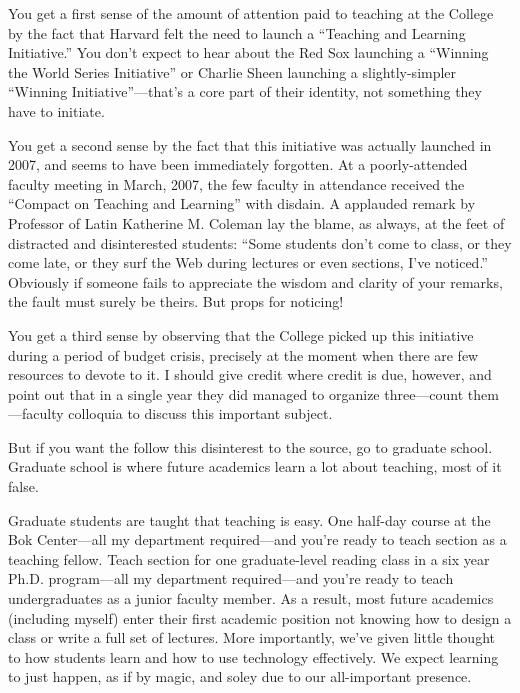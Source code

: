 
You get a first sense of the amount of attention paid to teaching at the
College by the fact that Harvard felt the need to launch a ``Teaching and
Learning Initiative.'' You don't expect to hear about the Red Sox launching a
``Winning the World Series Initiative'' or Charlie Sheen launching a
slightly-simpler ``Winning Initiative''---that's a core part of their
identity, not something they have to initiate.

You get a second sense by the fact that this initiative was actually launched
in 2007, and seems to have been immediately forgotten. At a poorly-attended
faculty meeting in March, 2007, the few faculty in attendance received the
``Compact on Teaching and Learning'' with disdain. A applauded remark by
Professor of Latin Katherine M. Coleman lay the blame, as always, at the feet
of distracted and disinterested students: ``Some students don’t come to
class, or they come late, or they surf the Web during lectures or even
sections, I’ve noticed.'' Obviously if someone fails to appreciate the wisdom
and clarity of your remarks, the fault must surely be theirs. But props for
noticing!

You get a third sense by observing that the College picked up this initiative
during a period of budget crisis, precisely at the moment when there are few
resources to devote to it. I should give credit where credit is due, however,
and point out that in a single year they did managed to organize
three---count them---faculty colloquia to discuss this important subject.

But if you want the follow this disinterest to the source, go to graduate
school. Graduate school is where future academics learn a lot about teaching,
most of it false.

Graduate students are taught that teaching is easy. One half-day course at
the Bok Center---all my department required---and you're ready to teach
section as a teaching fellow. Teach section for one graduate-level reading
class in a six year Ph.D. program---all my department required---and you're
ready to teach undergraduates as a junior faculty member. As a result, most
future academics (including myself) enter their first academic position not
knowing how to design a class or write a full set of lectures. More
importantly, we've given little thought to how students learn and how to use
technology effectively. We expect learning to just happen, as if by magic,
and soley due to our all-important presence.

